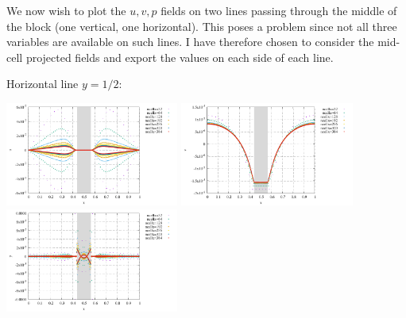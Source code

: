 We now wish to plot the $u,v,p$ fields on two lines passing through the middle 
of the block (one vertical, one horizontal). This poses a problem since not all 
three variables are available on such lines. I have therefore chosen to consider the 
mid-cell projected fields and export the values on each side of each line.

Horizontal line $y=1/2$:
\begin{center}
\includegraphics[width=5.7cm]{python_codes/fieldstone_158/results/exp5/profilex_u}
\includegraphics[width=5.7cm]{python_codes/fieldstone_158/results/exp5/profilex_v}
\includegraphics[width=5.7cm]{python_codes/fieldstone_158/results/exp5/profilex_p}
\end{center} 

